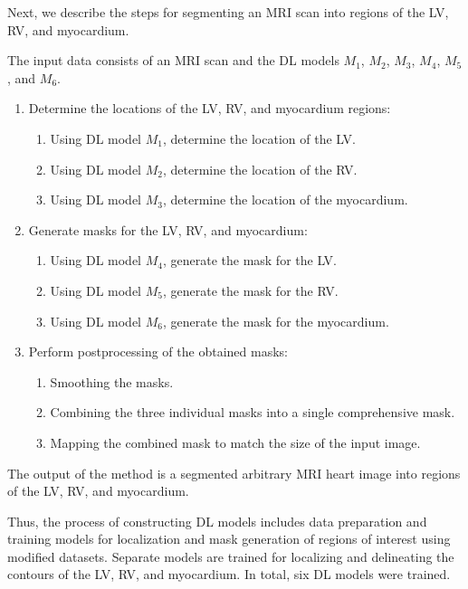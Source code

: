 \documentclass[fleqn,10pt]{wlscirep}
\begin{document}
Next, we describe the steps for segmenting an MRI scan into regions of the LV, RV, and myocardium.

The input data consists of an MRI scan and the DL models \({M_1}\), \({M_2}\), \({M_3}\), \({M_4}\), \({M_5}\), and \({M_6}\).

\begin{enumerate}[label=Step \arabic*:, leftmargin=5em]
    \item Determine the locations of the LV, RV, and myocardium regions:
    \begin{enumerate}[label=Step 1.\arabic*:, leftmargin=2.5em]
        \item Using DL model \({M_1}\), determine the location of the LV.
        \item Using DL model \({M_2}\), determine the location of the RV.
        \item Using DL model \({M_3}\), determine the location of the myocardium.
    \end{enumerate}
    \item Generate masks for the LV, RV, and myocardium:
    \begin{enumerate}[label=Step 2.\arabic*:, leftmargin=2.5em]
        \item Using DL model \({M_4}\), generate the mask for the LV.
        \item Using DL model \({M_5}\), generate the mask for the RV.
        \item Using DL model \({M_6}\), generate the mask for the myocardium.
    \end{enumerate}
    \item Perform postprocessing of the obtained masks:
    \begin{enumerate}[label=Step 3.\arabic*:, leftmargin=2.5em]
        \item Smoothing the masks.
        \item Combining the three individual masks into a single comprehensive mask.
        \item Mapping the combined mask to match the size of the input image.
    \end{enumerate}
\end{enumerate}

The output of the method is a segmented arbitrary MRI heart image into regions of the LV, RV, and myocardium.

Thus, the process of constructing DL models includes data preparation and training models for localization and mask generation of regions of interest using modified datasets. Separate models are trained for localizing and delineating the contours of the LV, RV, and myocardium. In total, six DL models were trained.
\end{document}

